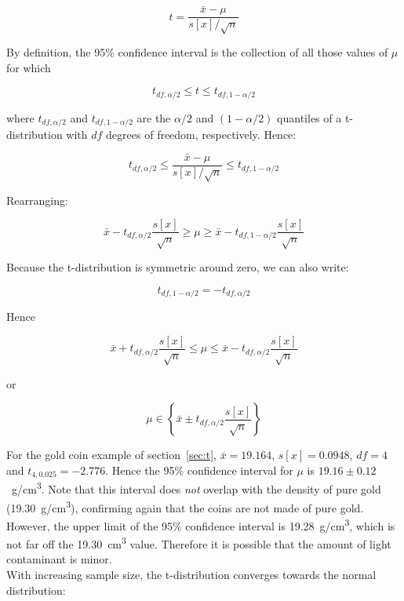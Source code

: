 \[
  t = \frac{\bar{x} - \mu}{s[x]/\sqrt{n}}
\]

By definition, the 95\% confidence interval is the collection of all
those values of $\mu$ for which

\[
t_{df,\alpha/2} \leq t \leq t_{df,1-\alpha/2}
\]

\noindent where $t_{df,\alpha/2}$ and $t_{df,1-\alpha/2}$ are the
$\alpha/2$ and $(1-\alpha/2)$ quantiles of a t-distribution with $df$
degrees of freedom, respectively.  Hence:

\[
t_{df,\alpha/2} \leq \frac{\bar{x} - \mu}{s[x]/\sqrt{n}} \leq t_{df,1-\alpha/2}
\]

Rearranging:

\[
\bar{x} - t_{df,\alpha/2}\frac{s[x]}{\sqrt{n}} \geq \mu \geq
\bar{x} - t_{df,1-\alpha/2}\frac{s[x]}{\sqrt{n}}
\]

Because the t-distribution is symmetric around zero, we can also write:

\[
t_{df,1-\alpha/2} = -t_{df,\alpha/2}
\]

Hence

\[
\bar{x} + t_{df,\alpha/2}\frac{s[x]}{\sqrt{n}} \leq \mu \leq
\bar{x} - t_{df,\alpha/2}\frac{s[x]}{\sqrt{n}}
\]

\noindent or

\begin{equation}
  \mu \in \left\{\bar{x} \pm t_{df,\alpha/2}\frac{s[x]}{\sqrt{n}}\right\}
  \label{eq:tci}
\end{equation}

For the gold coin example of section~\ref{sec:t}, $\bar{x}=19.164$,
$s[x]=0.0948$, $df=4$ and $t_{4,0.025}=-2.776$. Hence the 95\%
confidence interval for $\mu$ is
$19.16\pm{0.12}$~g/cm\textsuperscript{3}. Note that this interval does
\emph{not} overlap with the density of pure gold
(19.30~g/cm\textsuperscript{3}), confirming again that the coins are
not made of pure gold. However, the upper limit of the 95\% confidence
interval is 19.28~g/cm\textsuperscript{3}, which is not far off the
19.30~cm\textsuperscript{3} value. Therefore it is possible that the
amount of light contaminant is minor.\\

With increasing sample size, the t-distribution converges towards the
normal distribution:

